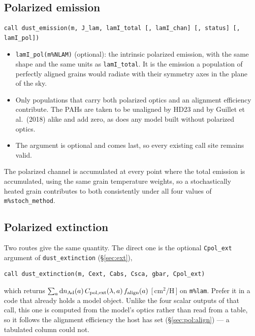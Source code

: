 \documentclass{my_memo}
\newcommand{\code}[1]{\texttt{#1}}
\begin{document}
\subsection{Polarized emission}

\begin{lstlisting}
call dust_emission(m, J_lam, lamI_total [, lamI_chan] [, status] [, lamI_pol])
\end{lstlisting}
\begin{itemize}
\item \code{lamI\_pol(m\%NLAM)} (optional): the intrinsic polarized emission,
      with the same shape and the same units as \code{lamI\_total}. It is the
      emission a population of perfectly aligned grains would radiate with
      their symmetry axes in the plane of the sky.
\item Only populations that carry both polarized optics and an alignment
      efficiency contribute. The PAHs are taken to be unaligned by HD23 and by
      Guillet et al.\ (2018) alike and add zero, as does any model built
      without polarized optics.
\item The argument is optional and comes last, so every existing call site
      remains valid.
\end{itemize}

\noindent The polarized channel is accumulated at every point where the total
emission is accumulated, using the same grain temperature weights, so a
stochastically heated grain contributes to both consistently under all four
values of \code{m\%stoch\_method}.

\subsection{Polarized extinction}

Two routes give the same quantity. The direct one is the optional
\code{Cpol\_ext} argument of \code{dust\_extinction} (\S\ref{sec:ext}),
\begin{lstlisting}
call dust_extinction(m, Cext, Cabs, Csca, gbar, Cpol_ext)
\end{lstlisting}
which returns
$\sum_a {\rm d}n_{\rm Ad}(a)\,C_{\rm pol,ext}(\lambda,a)\,f_{\rm align}(a)$
[\,cm$^2$/H\,] on \code{m\%lam}. Prefer it in a code that already holds a model
object. Unlike the four scalar outputs of that call, this one is computed from
the model's optics rather than read from a table, so it follows the alignment
efficiency the host has set (\S\ref{sec:pol:align}) --- a tabulated column could
not.
\end{document}
